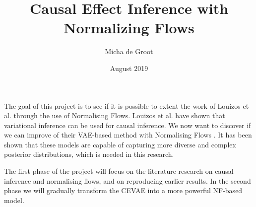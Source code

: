 \documentclass{article}
\title{Causal Effect Inference with Normalizing Flows}
\author{Micha de Groot}
\date{August 2019}
\begin{document}
\maketitle

\noindent
The goal of this project is to see if it is possible to extent the work of Louizos et al. \cite{louizos2017causal} through the use of Normalising Flows. Louizos et al. have shown that variational inference can be used for causal inference. We now want to discover if we can improve of their VAE-based \cite{kingma2013auto} method with Normalising Flows \cite{rezende2016variational}\cite{berg2018sylvester}\cite{dinh2016density}. It has been shown that these models are capable of capturing more diverse and complex posterior distributions, which is needed in this research.

The first phase of the project will focus on the literature research on causal inference and normalising flows, and on reproducing earlier results. In the second phase we will gradually transform the CEVAE into a more powerful NF-based model.



\end{document}
